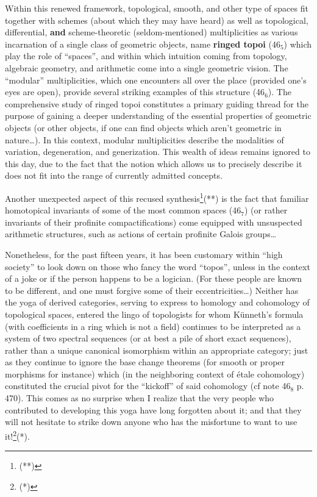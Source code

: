 Within this renewed framework, topological, smooth, and other type of spaces
fit together with schemes (about which they may have heard) 
as well as topological, differential, \textbf{and} scheme-theoretic
(seldom-mentioned) multiplicities
as various incarnation of 
a single class of geometric objects, name \textbf{ringed topoi} 
(46$_5$) which play the role of ``spaces'', and within 
which intuition coming from topology, algebraic geometry, and arithmetic come
into a single geometric vision.
The ``modular'' multiplicities,
which one encounters all over the place
(provided one's eyes are open), provide several striking examples of this structure (46$_6$).
The comprehensive study of ringed topoi constitutes a primary guiding thread for the
purpose of gaining a deeper understanding of the essential properties of geometric
objects (or other objects, if one can find objects which aren't geometric in
nature\ldots).
In this context, modular multiplicities describe the modalities of variation,
degeneration, and generization.
This wealth of ideas remains ignored to this day, 
due to the fact that the notion which allows us to precisely describe it does not fit into 
the range of currently admitted concepts.

Another unexpected aspect of this recused synthesis\footnote{(**)}(**)
is the fact that familiar homotopical invariants 
of some of the most common spaces
(46$_7$)
(or rather invariants of their profinite compactifications) 
come equipped with unsuspected arithmetic structures, such as actions of certain profinite
Galois groups\ldots

Nonetheless, for the past fifteen years, it has been customary within ``high society'' to 
look down on those who fancy the word ``topos'', unless in the context of a
joke or if the person happens to be a logician.
(For these people are known to be different, and one must forgive some of their
eccentricities\ldots)
Neither has the yoga of derived categories, serving to express to homology and cohomology
of topological spaces, entered the lingo of topologists for whom K\"unneth's formula
(with coefficients in a ring which is not a field)
continues to be interpreted as a system of two spectral sequences (or at best a pile of
short exact sequences), 
rather than a unique canonical isomorphism within an appropriate category;
just as they continue to ignore the base change theorems (for smooth or proper morphisms
for instance) which (in the neighboring context of \'etale cohomology) constituted the
crucial pivot for the ``kickoff'' of said cohomology (cf note 46$_8$ p. 470).
This comes as no surprise when I realize that the very people who contributed to developing
this yoga have long forgotten about it; and that they will not hesitate to 
strike down anyone who has the misfortune to want to use it!\footnote{(*)}(*).

